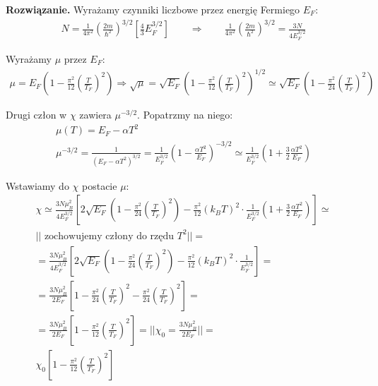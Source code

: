 \documentclass[11pt,a4paper]{article}
\newenvironment{solution}{\vspace{1cm} \par\textbf{Rozwiązanie.} \vspace{1cm}}{}
\begin{document}
\begin{solution}
Wyrażamy czynniki liczbowe przez energię Fermiego $E_F$:
\begin{align*}
N = \frac{1}{4\pi^{2}} \left( \frac{2m}{\hbar^2} \right)^{3/2} \left[
\frac{4}{3} E_F^{3/2}\right] \qquad \Rightarrow \qquad
\frac{1}{4\pi^{2}} \left( \frac{2m}{\hbar^2} \right)^{3/2} = \frac{3N}{4 E_F^{3/2}}
\end{align*}

Wyrażamy $\mu$ przez $E_F$:
\begin{align*}
\mu = E_F \left( 1 - \frac{\pi^2}{12} \left( \frac{T}{T_F} \right)^2 \right) \Rightarrow 
\sqrt{\mu} = \sqrt{E_F} \left( 1 - \frac{\pi^2}{12} \left( \frac{T}{T_F} \right)^2 \right)^{1/2} \simeq
\sqrt{E_F} \left( 1 - \frac{\pi^2}{24} \left( \frac{T}{T_F} \right)^2 \right)
\end{align*}

Drugi człon w $\chi$ zawiera $\mu^{-3/2}$. Popatrzmy na niego:
\begin{align*}
\mu(T) = E_F - \alpha T^2 \\
\mu^{-3/2} = \frac{1}{(E_F - \alpha T^2)^{3/2}} = \frac{1}{E_F^{3/2}} \left( 1 - \frac{\alpha T^2}{E_F} \right)^{-3/2} \simeq
\frac{1}{E_F^{3/2}} \left( 1 + \frac{3}{2} \frac{\alpha T^2}{E_F} \right)
\end{align*}

Wstawiamy do $\chi$ postacie $\mu$:
\begin{align*}
\chi \simeq \frac{3N \mu_B^2}{4 E_F^{3/2}} \left[
2 \sqrt{E_F} \left( 1 - \frac{\pi^2}{24} \left( \frac{T}{T_F} \right)^2 \right) - \frac{\pi^2}{12} (k_B T)^2 \cdot \frac{1}{E_F^{3/2}} \left(1 + \frac{3}{2} \frac{\alpha T^2}{E_F}
\right) \right] \simeq \\
|| \text{ zochowujemy człony do rzędu } T^2 || = \\
= \frac{3N \mu_B^2}{4 E_F^{3/2}} \left[
2 \sqrt{E_F} \left(1 - \frac{\pi^2}{24} \left( \frac{T}{T_F} \right)^2 \right)
- \frac{\pi^2}{12} (k_B T)^2 \cdot \frac{1}{E_F^{3/2}}
\right] = \\
= \frac{3N \mu_B^2}{2 E_F} \left[
1 - \frac{\pi^2}{24} \left( \frac{T}{T_F} \right)^2 - \frac{\pi^2}{24} \left( \frac{T}{T_F} \right)^2
\right] = \\
= \frac{3N \mu_B^2}{2 E_F} \left[
1 - \frac{\pi^2}{12} \left( \frac{T}{T_F} \right)^2
\right] = || \chi_0 = \frac{3N \mu_B^2}{2 E_F} || = \\
\chi_0 \left[
1 - \frac{\pi^2}{12} \left( \frac{T}{T_F} \right)^2
\right]
\end{align*}


\newpage
\end{solution}


\end{document}
